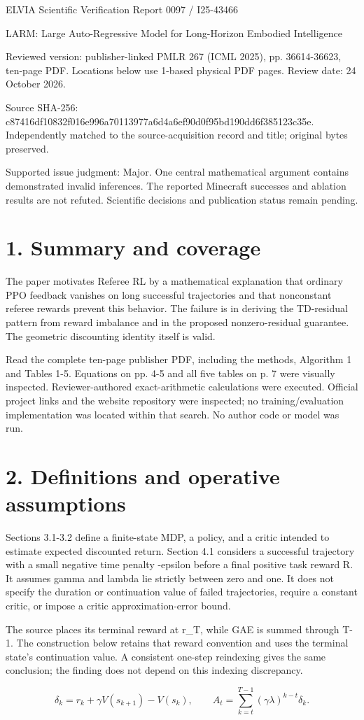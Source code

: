 \documentclass[10pt]{article}
\begin{document}
ELVIA Scientific Verification Report
0097 / I25-43466\par
LARM: Large Auto-Regressive Model for Long-Horizon Embodied Intelligence\par
Reviewed version: publisher-linked PMLR 267 (ICML 2025), pp. 36614-36623, ten-page PDF. Locations below use 1-based physical PDF pages. Review date: 24 October 2026.\par
Source SHA-256: c87416df10832f016e996a70113977a6d4a6ef90d0f95bd190dd6f385123c35e. Independently matched to the source-acquisition record and title; original bytes preserved.\par
Supported issue judgment: Major. One central mathematical argument contains demonstrated invalid inferences. The reported Minecraft successes and ablation results are not refuted. Scientific decisions and publication status remain pending.\par
\section*{1. Summary and coverage}
The paper motivates Referee RL by a mathematical explanation that ordinary PPO feedback vanishes on long successful trajectories and that nonconstant referee rewards prevent this behavior. The failure is in deriving the TD-residual pattern from reward imbalance and in the proposed nonzero-residual guarantee. The geometric discounting identity itself is valid.\par
Read the complete ten-page publisher PDF, including the methods, Algorithm 1 and Tables 1-5. Equations on pp. 4-5 and all five tables on p. 7 were visually inspected. Reviewer-authored exact-arithmetic calculations were executed. Official project links and the website repository were inspected; no training/evaluation implementation was located within that search. No author code or model was run.\par
\section*{2. Definitions and operative assumptions}
Sections 3.1-3.2 define a finite-state MDP, a policy, and a critic intended to estimate expected discounted return. Section 4.1 considers a successful trajectory with a small negative time penalty -epsilon before a final positive task reward R. It assumes gamma and lambda lie strictly between zero and one. It does not specify the duration or continuation value of failed trajectories, require a constant critic, or impose a critic approximation-error bound.\par
The source places its terminal reward at r\_T, while GAE is summed through T-1. The construction below retains that reward convention and uses the terminal state’s continuation value. A consistent one-step reindexing gives the same conclusion; the finding does not depend on this indexing discrepancy.\par
\[\delta_k=r_k+\gamma V(s_{k+1})-V(s_k),\qquad A_t=\sum_{k=t}^{T-1}(\gamma\lambda)^{k-t}\delta_k.\]\par
\end{document}
